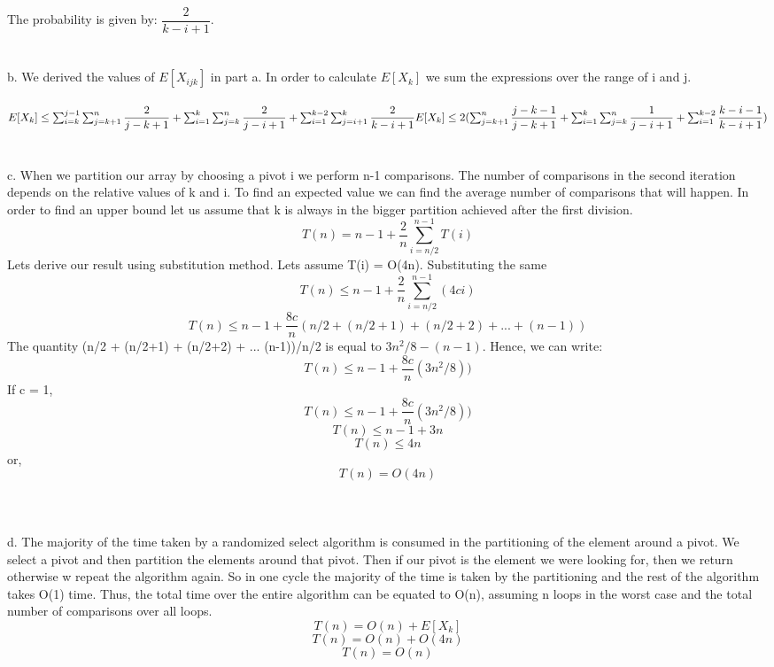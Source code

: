 \documentclass[10pt]{article}
\begin{document}
The probability is given by: $\dfrac{2}{k-i+1}$.\\\\\\
b. We derived the values of $E[X_{ijk}]$ in part a. In order to calculate $E[X_k]$ we sum the expressions over the range of i and j.\\\\
$E[X_k] \leq \sum_{i=k}^{j-1}\sum_{j=k+1}^{n}\dfrac{2}{j-k+1} + \sum_{i=1}^{k}\sum_{j=k}^{n}\dfrac{2}{j-i+1} + \sum_{i=1}^{k-2}\sum_{j=i+1}^{k}\dfrac{2}{k-i+1}\\\\
E[X_k] \leq 2(\sum_{j=k+1}^{n}\dfrac{j-k-1}{j-k+1} + \sum_{i=1}^{k}\sum_{j=k}^{n}\dfrac{1}{j-i+1} + \sum_{i=1}^{k-2}\dfrac{k-i-1}{k-i+1})$\\\\\\
c. When we partition our array by choosing a pivot i we perform n-1 comparisons. The number of comparisons in the second iteration depends on the relative values of k and i. To find an expected value we can find the average number of comparisons that will happen. In order to find an upper bound let us assume that k is always in the bigger partition achieved after the first division.
$$T(n) = n-1 + \dfrac{2}{n}\sum_{i=n/2}^{n-1}T(i)$$
Lets derive our result using substitution method. Lets assume T(i) = O(4n). Substituting the same 
$$T(n) \leq n-1 + \dfrac{2}{n}\sum_{i=n/2}^{n-1}(4ci)$$
$$T(n) \leq n-1 + \dfrac{8c}{n}(n/2 + (n/2+1) + (n/2+2) + ... + (n-1))$$
The quantity (n/2 + (n/2+1) + (n/2+2) + ... (n-1))/n/2 is equal to $3n^2/8-(n-1)$. Hence, we can write:
$$T(n) \leq n-1 + \dfrac{8c}{n}(3n^2/8))$$
If c = 1,
$$T(n) \leq n-1 + \dfrac{8c}{n}(3n^2/8))$$
$$T(n) \leq n-1 + 3n$$
$$T(n) \leq 4n$$
or, $$T(n) = O(4n)$$
\\\\\\
d. The majority of the time taken by a randomized select algorithm is consumed in the partitioning of the element around a pivot. We select a pivot and then partition the elements around that pivot. Then if our pivot is the element we were looking for, then we return otherwise w repeat the algorithm again. So in one cycle the majority of the time is taken by the partitioning and the rest of the algorithm takes O(1) time. Thus, the total time over the entire algorithm can be equated to O(n), assuming n loops in the worst case and the total number of comparisons over all loops.
$$T(n) = O(n) + E[X_{k}]$$
$$T(n) = O(n) + O(4n)$$
$$\boxed{T(n) = O(n)}$$
\newpage
\end{document}
